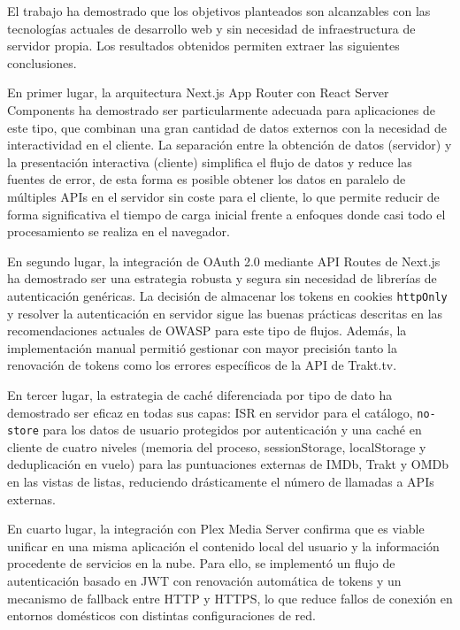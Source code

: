 El trabajo ha demostrado que los objetivos planteados son alcanzables con las tecnologías actuales de desarrollo web y sin necesidad de infraestructura de servidor propia. Los resultados obtenidos permiten extraer las siguientes conclusiones.

En primer lugar, la arquitectura Next.js App Router con React Server Components ha demostrado ser particularmente adecuada para aplicaciones de este tipo, que combinan una gran cantidad de datos externos con la necesidad de interactividad en el cliente. La separación entre la obtención de datos (servidor) y la presentación interactiva (cliente) simplifica el flujo de datos y reduce las fuentes de error, de esta forma es posible obtener los datos en paralelo de múltiples APIs en el servidor sin coste para el cliente, lo que permite reducir de forma significativa el tiempo de carga inicial frente a enfoques donde casi todo el procesamiento se realiza en el navegador.

En segundo lugar, la integración de OAuth 2.0 \parencite{NextJS:2024,OWASP:2021} mediante API Routes de Next.js ha demostrado ser una estrategia robusta y segura sin necesidad de librerías de autenticación genéricas. La decisión de almacenar los tokens en cookies \texttt{httpOnly} y resolver la autenticación en servidor sigue las buenas prácticas descritas en las recomendaciones actuales de OWASP \parencite{OWASP:2021,OWASP:2024} para este tipo de flujos. Además, la implementación manual permitió gestionar con mayor precisión tanto la renovación de tokens como los errores específicos de la API de Trakt.tv.

En tercer lugar, la estrategia de caché diferenciada por tipo de dato ha demostrado ser eficaz en todas sus capas: ISR en servidor \parencite{Vercel:2024c} para el catálogo, \texttt{no-store} para los datos de usuario protegidos por autenticación y una caché en cliente de cuatro niveles (memoria del proceso, sessionStorage, localStorage y deduplicación en vuelo) \parencite{MDN:2024a} para las puntuaciones externas de IMDb, Trakt y OMDb en las vistas de listas, reduciendo drásticamente el número de llamadas a APIs externas.

En cuarto lugar, la integración con Plex Media Server confirma que es viable unificar en una misma aplicación el contenido local del usuario y la información procedente de servicios en la nube. Para ello, se implementó un flujo de autenticación basado en JWT con renovación automática de tokens y un mecanismo de fallback entre HTTP y HTTPS, lo que reduce fallos de conexión en entornos domésticos con distintas configuraciones de red.

